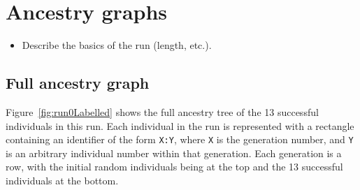 




\section{Ancestry graphs}
\label{sec:ancestryGraphs}





\begin{itemize}
	\item Describe the basics of the run (length, etc.).
\end{itemize}

\subsection{Full ancestry graph}

Figure~\ref{fig:run0Labelled} shows the full ancestry tree of the 13 successful 
individuals in this run. Each individual in the run is represented with a
rectangle containing an identifier of the form \texttt{X:Y}, where \texttt{X}
is the generation number, and \texttt{Y} is an arbitrary individual number
within that generation. Each generation is a row, with the initial random
individuals being at the top and the 13 successful individuals at the bottom.

